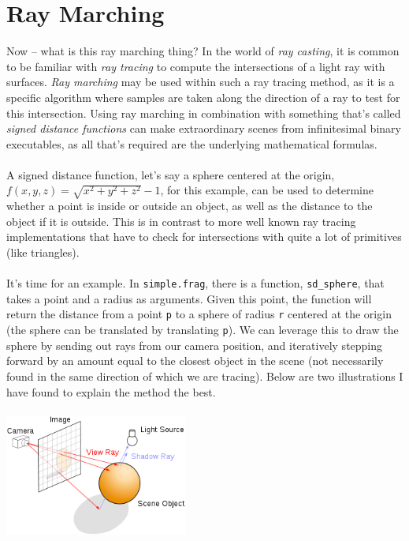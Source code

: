 \documentclass[abstract=off,oneside]{scrreprt}
\begin{document}
\section*{Ray Marching}
\label{sec-3}
Now -- what is this ray marching thing? In the world of \emph{ray casting},
it is common to be familiar with \emph{ray tracing} to compute the
intersections of a light ray with surfaces. \emph{Ray marching} may be used
within such a ray tracing method, as it is a specific algorithm where
samples are taken along the direction of a ray to test for this
intersection. Using ray marching in combination with something that's
called \emph{signed distance functions} can make extraordinary
scenes from infinitesimal binary executables, as all that's required
are the underlying mathematical formulas.
\\\\
A signed distance function, let's say a sphere centered at the origin,
$f(x, y, z) = \sqrt{x^2 + y^2 + z^2} - 1$, for this example, can be
used to determine whether a point is inside or outside an object, as
well as the distance to the object if it is outside. This is in
contrast to more well known ray tracing implementations that have to
check for intersections with quite a lot of primitives (like
triangles).
\\\\
It's time for an example. In \verb~simple.frag~, there is a function,
\verb~sd_sphere~, that takes a point and a radius as arguments. Given this
point, the function will return the distance from a point \verb~p~ to a
sphere of radius \verb~r~ centered at the origin (the sphere can be
translated by translating \verb~p~). We can leverage this to draw the
sphere by sending out rays from our camera position, and iteratively
stepping forward by an amount equal to the closest object in the scene
(not necessarily found in the same direction of which we are
tracing). Below are two illustrations I have found to explain the
method the best.
\\\\
\includegraphics[width=0.45\textwidth]{./img/raytrace.png}
$\hspace{35pt}$
\end{document}
